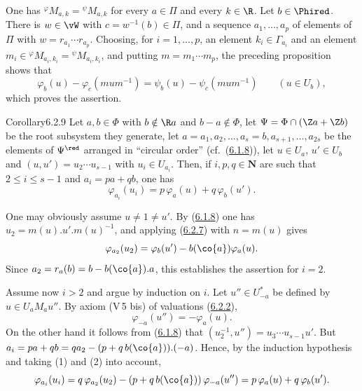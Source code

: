 \documentclass[12pt,a4paper,oneside,english]{smfart}
\makeatletter
\newcommand{\btanchor}[1]{\leavevmode\Hy@raisedlink{\hypertarget{bt:#1}{}}}
\newcommand{\btref}[1]{\hyperlink{bt:#1}{#1}}
\theoremstyle{definition}
\theoremstyle{bt}
\makeatother
\begin{document}
\begin{sketch}
One has ${}^{\varphi}M_{a,k}={}^{\psi}M_{a,k}$ for every $a\in\Pi$ and every
$k\in\R$. Let $b\in\Phired$. There is $w\in\vW$ with $c=w^{-1}(b)\in\Pi$, and a
sequence $a_1,\dots,a_p$ of elements of $\Pi$ with $w=r_{a_1}\cdots r_{a_p}$.
Choosing, for $i=1,\dots,p$, an element $k_i\in\Gamma_{a_i}$ and an element
$m_i\in{}^{\varphi}M_{a_i,k_i}={}^{\psi}M_{a_i,k_i}$, and putting
$m=m_1\cdots m_p$, the preceding proposition shows that
\[ \varphi_b(u)-\varphi_c(mum^{-1})=\psi_b(u)-\psi_c(mum^{-1})\qquad(u\in U_b), \]
which proves the assertion.
\end{sketch}

\begin{stmt}{Corollary}{6.2.9}\btanchor{6.2.9}
Let $a,b\in\Phi$ with $b\notin\R a$ and $b-a\notin\Phi$, let
$\Psi=\Phi\cap(\Z a+\Z b)$ be the root subsystem they generate, let
$a=a_1,a_2,\dots,a_s=b,a_{s+1},\dots,a_{2s}$ be the elements of $\Psi^{\red}$
arranged in ``circular order'' (cf.\ (\btref{6.1.8})), let $u\in U_a$, $u'\in U_b$ and
$(u,u')=u_2\cdots u_{s-1}$ with $u_i\in U_{a_i}$. Then, if $i,p,q\in\mathbf{N}$
are such that $2\le i\le s-1$ and $a_i=pa+qb$, one has
\[ \varphi_{a_i}(u_i)=p\,\varphi_a(u)+q\,\varphi_b(u'). \]
\end{stmt}

\begin{sketch}
One may obviously assume $u\ne1\ne u'$. By (\btref{6.1.8}) one has
$u_2=m(u).u'.m(u)^{-1}$, and applying (\btref{6.2.7}) with $n=m(u)$ gives
\begin{equation}
\varphi_{a_2}(u_2)=\varphi_b(u')-b(\co{a})\varphi_a(u).
\end{equation}
Since $a_2=r_a(b)=b-b(\co{a}).a$, this establishes the assertion for $i=2$.

Assume now $i>2$ and argue by induction on $i$. Let $u''\in U^{*}_{-a}$ be defined
by $u\in U_aM_au''$. By axiom (V\,5 bis) of valuations (\btref{6.2.2}),
\begin{equation}
\varphi_{-a}(u'')=-\varphi_a(u).
\end{equation}
On the other hand it follows from (\btref{6.1.8}) that $(u_2^{-1},u'')=u_3\cdots u_{s-1}u'$.
But $a_i=pa+qb=qa_2-(p+q\,b(\co{a})).(-a)$. Hence, by the induction hypothesis and
taking (1) and (2) into account,
\[ \varphi_{a_i}(u_i)=q\,\varphi_{a_2}(u_2)-(p+q\,b(\co{a}))\,\varphi_{-a}(u'')
   =p\,\varphi_a(u)+q\,\varphi_b(u'). \]
\end{sketch}
\end{document}
